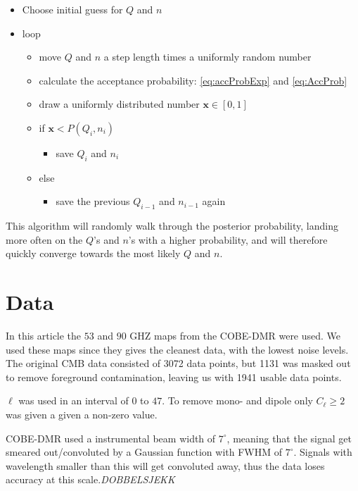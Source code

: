 \documentclass{emulateapj}
\begin{document}
\begin{itemize}
\item Choose initial guess for $Q$ and $n$
\item loop
    \begin{itemize}
     \item move $Q$ and $n$ a step length times a uniformly random number
     \item calculate the acceptance probability: \eqref{eq:accProbExp} and \eqref{eq:AccProb}
     \item draw a uniformly distributed number $\mathbf{x}\in[0,1]$
     \item if $\mathbf{x} < P(Q_i,n_i)$
     \begin{itemize}
     \item save $Q_i$ and $n_i$
     \end{itemize}
     \item else
     \begin{itemize}
     \item save the previous $Q_{i-1}$ and $n_{i-1}$ again
     \end{itemize}
     \end{itemize}
\end{itemize}

This algorithm will randomly walk through the posterior probability, landing more often on the $Q$'s and $n$'s with a higher probability, and will therefore quickly converge towards the most likely $Q$ and $n$.




%
%

\section{Data}
\label{sec:data}

In this article the $53$ and $90$ GHZ maps from the COBE-DMR were used. We used these maps since they gives the cleanest data, with the lowest noise levels. The original CMB data consisted of 3072 data points, but 1131 was masked out to remove foreground contamination, leaving us with 1941 usable data points.

$\ell$ was used in an interval of $0$ to $47$. To remove mono- and dipole only $C_\ell \geq 2$ was given a given a non-zero value.

COBE-DMR used a instrumental beam width of $7^\circ$, meaning that the signal get smeared out/convoluted by a Gaussian function with FWHM of $7^\circ$. Signals with wavelength smaller than this will get convoluted away, thus the data loses accuracy at this scale.\emph{DOBBELSJEKK}
\end{document}
